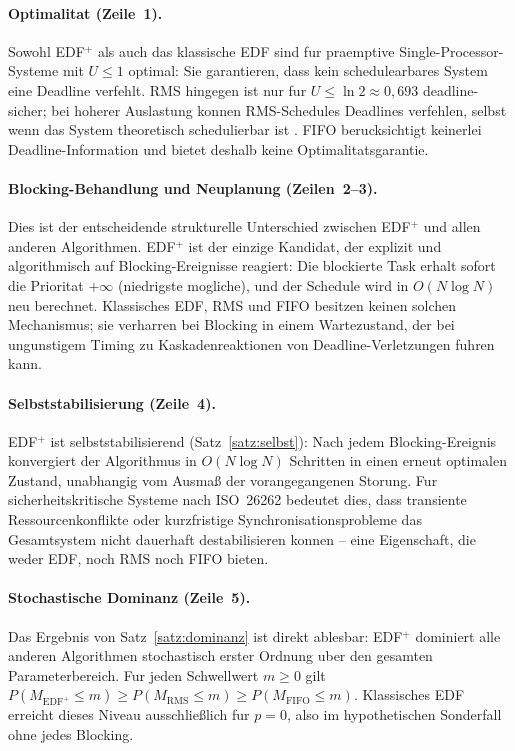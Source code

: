 ﻿\documentclass[a4paper,12pt]{article}
\theoremstyle{definition}
\begin{document}
	\paragraph{Optimalitat (Zeile~1).}
	Sowohl EDF$^+$ als auch das klassische EDF sind fur praemptive Single-Processor-Systeme
	mit $U \le 1$ optimal: Sie garantieren, dass kein schedulearbares System eine Deadline verfehlt.
	RMS hingegen ist nur fur $U \le \ln 2 \approx 0{,}693$ deadline-sicher; bei hoherer
	Auslastung konnen RMS-Schedules Deadlines verfehlen, selbst wenn das System theoretisch
	schedulierbar ist \cite{Liu1973}. FIFO berucksichtigt keinerlei Deadline-Information und
	bietet deshalb keine Optimalitatsgarantie.

	\paragraph{Blocking-Behandlung und Neuplanung (Zeilen~2--3).}
	Dies ist der entscheidende strukturelle Unterschied zwischen EDF$^+$ und allen anderen
	Algorithmen. EDF$^+$ ist der einzige Kandidat, der explizit und algorithmisch auf
	Blocking-Ereignisse reagiert: Die blockierte Task erhalt sofort die Prioritat $+\infty$
	(niedrigste mogliche), und der Schedule wird in $O(N \log N)$ neu berechnet.
	Klassisches EDF, RMS und FIFO besitzen keinen solchen Mechanismus; sie verharren bei
	Blocking in einem Wartezustand, der bei ungunstigem Timing zu Kaskadenreaktionen von
	Deadline-Verletzungen fuhren kann.

	\paragraph{Selbststabilisierung (Zeile~4).}
	EDF$^+$ ist selbststabilisierend (Satz~\ref{satz:selbst}): Nach jedem Blocking-Ereignis
	konvergiert der Algorithmus in $O(N \log N)$ Schritten in einen erneut optimalen Zustand,
	unabhangig vom Ausma\ss{} der vorangegangenen Storung. Fur sicherheitskritische
	Systeme nach ISO~26262 bedeutet dies, dass transiente Ressourcenkonflikte oder kurzfristige
	Synchronisationsprobleme das Gesamtsystem nicht dauerhaft destabilisieren konnen --
	eine Eigenschaft, die weder EDF, noch RMS noch FIFO bieten.

	\paragraph{Stochastische Dominanz (Zeile~5).}
	Das Ergebnis von Satz~\ref{satz:dominanz} ist direkt ablesbar: EDF$^+$ dominiert alle
	anderen Algorithmen stochastisch erster Ordnung uber den gesamten Parameterbereich.
	Fur jeden Schwellwert $m \ge 0$ gilt
	$P(M_{\text{EDF}^+} \le m) \ge P(M_{\text{RMS}} \le m) \ge P(M_{\text{FIFO}} \le m)$.
	Klassisches EDF erreicht dieses Niveau ausschlie\ss{}lich fur $p = 0$, also im
	hypothetischen Sonderfall ohne jedes Blocking.
\end{document}
